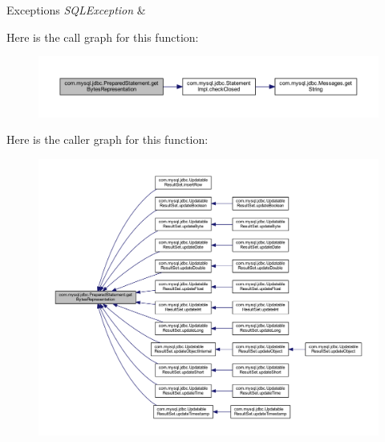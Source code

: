 \begin{DoxyExceptions}{Exceptions}
{\em S\+Q\+L\+Exception} & \\
\hline
\end{DoxyExceptions}
Here is the call graph for this function\+:
\nopagebreak
\begin{figure}[H]
\begin{center}
\leavevmode
\includegraphics[width=350pt]{classcom_1_1mysql_1_1jdbc_1_1_prepared_statement_a9d7f8d794591450a31fc804150054196_cgraph}
\end{center}
\end{figure}
Here is the caller graph for this function\+:
\nopagebreak
\begin{figure}[H]
\begin{center}
\leavevmode
\includegraphics[width=350pt]{classcom_1_1mysql_1_1jdbc_1_1_prepared_statement_a9d7f8d794591450a31fc804150054196_icgraph}
\end{center}
\end{figure}
\mbox{\label{classcom_1_1mysql_1_1jdbc_1_1_prepared_statement_a7fd98fc094ff75e0c2cacedb818f236e}} 
